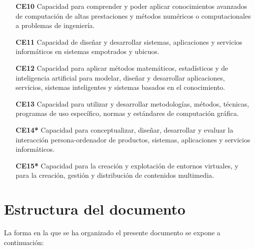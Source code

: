 \begin{itemize}
\item[\textbf{CE10}] Capacidad para comprender y poder aplicar conocimientos avanzados de
computación de altas prestaciones y métodos numéricos o computacionales a
problemas de ingeniería.
\item[\textbf{CE11}] Capacidad de diseñar y desarrollar sistemas, aplicaciones y servicios
informáticos
en sistemas empotrados y ubicuos.
\item[\textbf{CE12}] Capacidad para aplicar métodos matemáticos, estadísticos y de
inteligencia
artificial para modelar, diseñar y desarrollar aplicaciones, servicios, sistemas
inteligentes y sistemas basados en el conocimiento.
\item[\textbf{CE13}] Capacidad para utilizar y desarrollar metodologías, métodos, técnicas,
programas
de uso específico, normas y estándares de computación gráfica.

\item[\textbf{CE14*}] Capacidad para conceptualizar, diseñar, desarrollar y evaluar la
interacción
persona-ordenador de productos, sistemas, aplicaciones y servicios informáticos.
\item[\textbf{CE15*}] Capacidad para la creación y explotación de entornos virtuales, y para la
creación, gestión y distribución de contenidos multimedia.

\end{itemize}

\section{Estructura del documento}

La forma en la que se ha organizado el presente documento se expone a
continuación: 


